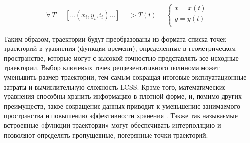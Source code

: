\begin{equation}\label{eq:regr-func}
	\forall\ T = [\ldots (x_i, y_i, t_i) \ldots] = > T(t) = 
		\begin{cases}
			x = x(t) \\
			y = y(t) \\
		\end{cases}
\end{equation}

Таким образом, траектории будут преобразованы из формата списка точек траекторий в уравнения (функции времени), определенные в геометрическом пространстве, которые могут с высокой точностью представлять все исходные траектории. Выбор ключевых точек репрезентативного полинома может уменьшить размер траектории, тем самым сокращая итоговые эксплуатационные затраты и вычислительную сложность LCSS. Кроме того, математические уравнения способны хранить информацию в плотной форме, и, помимо других преимуществ, такое сокращение данных приводит к уменьшению занимаемого пространства и повышению эффективности хранения \cite{article:behav_form_extr}. Также так называемые встроенные «функции траектории» могут обеспечивать интерполяцию и позволяют определять пропущенные, потерянные точки траекторий.

